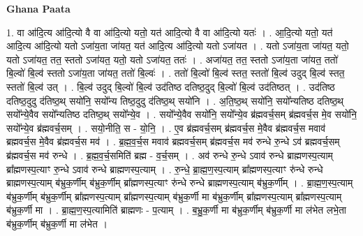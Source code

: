 \documentclass[17pt]{extarticle}
\begin{document}
\textbf{Ghana Paata } \newline

1. वा आ॑दि॒त्य आ॑दि॒त्यो वै वा आ॑दि॒त्यो यतो॒ यत॑ आदि॒त्यो वै वा आ॑दि॒त्यो यतः॑ । . आ॒दि॒त्यो यतो॒ यत॑ आदि॒त्य आ॑दि॒त्यो यतो ऽजा॑य॒ता जा॑यत॒ यत॑ आदि॒त्य आ॑दि॒त्यो यतो ऽजा॑यत । . यतो ऽजा॑य॒ता जा॑यत॒ यतो॒ यतो ऽजा॑यत॒ तत॒ स्ततो ऽजा॑यत॒ यतो॒ यतो ऽजा॑यत॒ ततः॑ । . अजा॑यत॒ तत॒ स्ततो ऽजा॑य॒ता जा॑यत॒ ततो॑ बि॒ल्वो॑ बि॒ल्व॑ स्ततो ऽजा॑य॒ता जा॑यत॒ ततो॑ बि॒ल्वः॑ । . ततो॑ बि॒ल्वो॑ बि॒ल्व॑ स्तत॒ स्ततो॑ बि॒ल्व॑ उदुद् बि॒ल्व॑ स्तत॒ स्ततो॑ बि॒ल्व॑ उत् । . बि॒ल्व॑ उदुद् बि॒ल्वो॑ बि॒ल्व॑ उद॑तिष्ठ दतिष्ठ॒दुद् बि॒ल्वो॑ बि॒ल्व॑ उद॑तिष्ठत् । . उद॑तिष्ठ दतिष्ठ॒दुदु द॑तिष्ठ॒थ् सयो॑नि॒ सयो᳚न्य तिष्ठ॒दुदु द॑तिष्ठ॒थ् सयो॑नि । . अ॒ति॒ष्ठ॒थ् सयो॑नि॒ सयो᳚न्यतिष्ठ दतिष्ठ॒थ् सयो᳚न्ये॒वैव सयो᳚न्यतिष्ठ दतिष्ठ॒थ् सयो᳚न्ये॒व । . सयो᳚न्ये॒वैव सयो॑नि॒ सयो᳚न्ये॒व ब्र॑ह्मवर्च॒सम् ब्र॑ह्मवर्च॒स मे॒व सयो॑नि॒ सयो᳚न्ये॒व ब्र॑ह्मवर्च॒सम् । . सयो॒नीति॒ स - यो॒नि॒ । . ए॒व ब्र॑ह्मवर्च॒सम् ब्र॑ह्मवर्च॒स मे॒वैव ब्र॑ह्मवर्च॒स मवाव॑ ब्रह्मवर्च॒स मे॒वैव ब्र॑ह्मवर्च॒स मव॑ । . ब्र॒ह्म॒व॒र्च॒स मवाव॑ ब्रह्मवर्च॒सम् ब्र॑ह्मवर्च॒स मव॑ रुन्धे रु॒न्धे ऽव॑ ब्रह्मवर्च॒सम् ब्र॑ह्मवर्च॒स मव॑ रुन्धे । . ब्र॒ह्म॒व॒र्च॒समिति॑ ब्रह्म - व॒र्च॒सम् । . अव॑ रुन्धे रु॒न्धे ऽवाव॑ रुन्धे ब्राह्मणस्प॒त्याम् ब्रा᳚ह्मणस्प॒त्याꣳ रु॒न्धे ऽवाव॑ रुन्धे ब्राह्मणस्प॒त्याम् । . रु॒न्धे॒ ब्रा॒ह्म॒ण॒स्प॒त्याम् ब्रा᳚ह्मणस्प॒त्याꣳ रु॑न्धे रुन्धे ब्राह्मणस्प॒त्याम् ब॑भ्रुक॒र्णीम् ब॑भ्रुक॒र्णीम् ब्रा᳚ह्मणस्प॒त्याꣳ रु॑न्धे रुन्धे ब्राह्मणस्प॒त्याम् ब॑भ्रुक॒र्णीम् । . ब्रा॒ह्म॒ण॒स्प॒त्याम् ब॑भ्रुक॒र्णीम् ब॑भ्रुक॒र्णीम् ब्रा᳚ह्मणस्प॒त्याम् ब्रा᳚ह्मणस्प॒त्याम् ब॑भ्रुक॒र्णी मा ब॑भ्रुक॒र्णीम् ब्रा᳚ह्मणस्प॒त्याम् ब्रा᳚ह्मणस्प॒त्याम् ब॑भ्रुक॒र्णी मा । . ब्रा॒ह्म॒ण॒स्प॒त्यामिति॑ ब्राह्मणः - प॒त्याम् । . ब॒भ्रु॒क॒र्णी मा ब॑भ्रुक॒र्णीम् ब॑भ्रुक॒र्णी मा ल॑भेत लभे॒ता ब॑भ्रुक॒र्णीम् ब॑भ्रुक॒र्णी मा ल॑भेत । \newline
\end{document}
